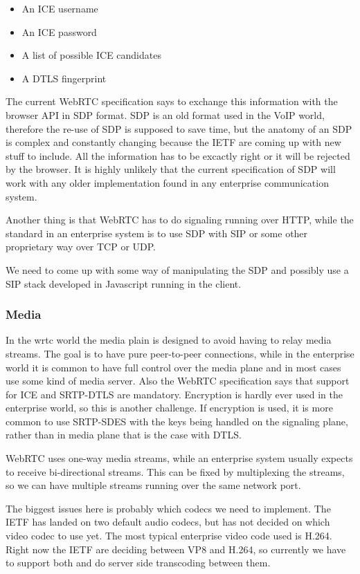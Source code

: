 \begin{itemize}
\item{An ICE username}
\item{An ICE password}
\item{A list of possible ICE candidates}
\item{A DTLS fingerprint}
\end{itemize}

The current WebRTC specification says to exchange this information with the browser API in SDP format. SDP is an old format used in the VoIP world, therefore the re-use of SDP is supposed to save time, but the anatomy of an SDP is complex and constantly changing because the IETF are coming up with new stuff to include. All the information has to be excactly right or it will be rejected by the browser. It is highly unlikely that the current specification of SDP will work with any older implementation found in any enterprise communication system.

Another thing is that WebRTC has to do signaling running over HTTP, while the standard in an enterprise system is to use SDP with SIP or some other proprietary way over TCP or UDP.

We need to come up with some way of manipulating the SDP and possibly use a SIP stack developed in Javascript running in the client.

\subsubsection{Media}
In the \gls{wrtc} world the media plain is designed to avoid having to relay media streams. The goal is to have pure peer-to-peer connections, while in the enterprise world it is common to have full control over the media plane and in most cases use some kind of media server. Also the WebRTC specification says that support for ICE and SRTP-DTLS are mandatory. Encryption is hardly ever used in the enterprise world, so this is another challenge. If encryption is used, it is more common to use SRTP-SDES with the keys being handled on the signaling plane, rather than in media plane that is the case with DTLS.

WebRTC uses one-way media streams, while an enterprise system usually expects to receive bi-directional streams. This can be fixed by multiplexing the streams, so we can have multiple streams running over the same network port.

The biggest issues here is probably which codecs we need to implement. The IETF has landed on two default audio codecs, but has not decided on which video codec to use yet. The most typical enterprise video code used is H.264. Right now the IETF are deciding between VP8 and H.264, so currently we have to support both and do server side transcoding between them.

